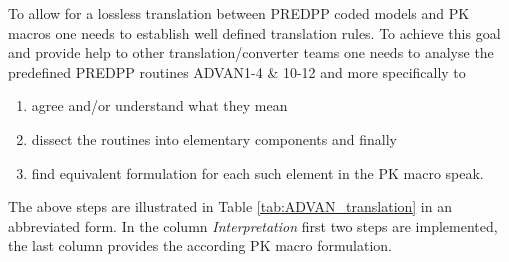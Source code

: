 To allow for a lossless translation between PREDPP coded models and PK macros one needs
to establish well defined translation rules. To achieve this goal and provide help to other 
translation/converter teams one needs to analyse the predefined PREDPP routines ADVAN1-4 \& 10-12
and more specifically to
\begin{enumerate}
\item
agree and/or understand what they mean
\item
dissect the routines into elementary components and finally 
\item
find equivalent formulation for each such element in the PK macro speak.
\end{enumerate}
The above steps are illustrated in Table \ref{tab:ADVAN_translation} in an abbreviated form. 
In the column \emph{Interpretation} first two steps are implemented, 
the last column provides the according PK macro formulation.

